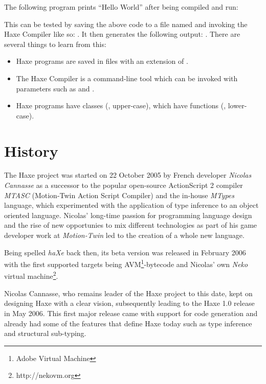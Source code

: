 The following program prints ``Hello World'' after being compiled and run:

This can be tested by saving the above code to a file named  and invoking the Haxe Compiler like so: . It then generates the following output: . There are several things to learn from this:

\begin{itemize}
	\item Haxe programs are saved in files with an extension of .
	\item The Haxe Compiler is a command-line tool which can be invoked with parameters such as  and .
	\item Haxe programs have classes (, upper-case), which have functions (, lower-case). 
\end{itemize}

\section{History}
\label{introduction-haxe-history}

The Haxe project was started on 22 October 2005 by French developer \emph{Nicolas Cannasse} as a successor to the popular open-source ActionScript 2 compiler \emph{MTASC} (Motion-Twin Action Script Compiler) and the in-house \emph{MTypes} language, which experimented with the application of type inference to an object oriented language. Nicolas' long-time passion for programming language design and the rise of new opportunies to mix different technologies as part of his game developer work at \emph{Motion-Twin} led to the creation of a whole new language.

Being spelled \emph{haXe} back then, its beta version was released in February 2006 with the first supported targets being AVM\footnote{Adobe Virtual Machine}-bytecode and Nicolas' own \emph{Neko} virtual machine\footnote{http://nekovm.org}.

Nicolas Cannasse, who remains leader of the Haxe project to this date, kept on designing Haxe with a clear vision, subsequently leading to the Haxe 1.0 release in May 2006. This first major release came with support for  code generation and already had some of the features that define Haxe today such as type inference and structural sub-typing.

